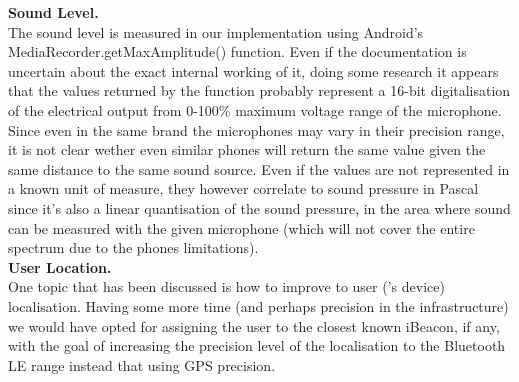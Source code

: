 \documentclass{sigchi}
\begin{document}
\textbf{Sound Level. }\\
The sound level is measured in our implementation using Android's MediaRecorder.getMaxAmplitude() function.
Even if the documentation is uncertain about the exact internal working of it, doing some research it appears that the values returned by the function probably represent a 16-bit digitalisation of the electrical output from 0-100\% maximum voltage range of the microphone. Since even in the same brand the microphones may vary in their precision range, it is  not clear wether even similar phones will return the same value given the same distance to the same sound source.
Even if the values are not represented in a known unit of measure, they however correlate to sound pressure in Pascal since it's also a linear quantisation of the sound pressure, in the area where sound can be measured with the given microphone (which will not cover the entire spectrum due to the phones limitations).\\

\textbf{User Location. }\\
One topic that has been discussed is how to improve to user ('s device) localisation. Having some more time (and perhaps precision in the infrastructure) we would have opted for assigning the user to the closest known iBeacon, if any, with the goal of increasing the precision level of the localisation to the Bluetooth LE range instead that using GPS precision.

%
%
%
%
%
\balance
\end{document}
